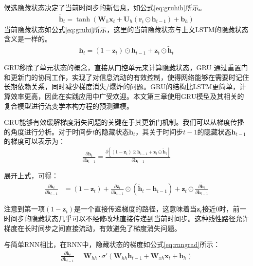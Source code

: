 候选隐藏状态决定了当前时间步的新信息，如公式\eqref{eq:gruhih}所示。
\begin{align}
  \tilde{\mathbf{h}}_t = \tanh(\mathbf{W}_h \mathbf{x}_t + \mathbf{U}_h (\mathbf{r}_t \odot \mathbf{h}_{t-1}) + \mathbf{b}_h) \label{eq:gruhih}
\end{align}
当前隐藏状态如公式\eqref{eq:gruhi}所示，这里的当前隐藏状态与上文LSTM的隐藏状态含义是一样的。
\begin{align}
  \mathbf{h}_t = (1 - \mathbf{z}_t) \odot \mathbf{h}_{t-1} + \mathbf{z}_t \odot \tilde{\mathbf{h}}_t \label{eq:gruhi}
\end{align}

GRU移除了单元状态的概念，直接从门控单元来计算隐藏状态，GRU 通过重置门和更新门的协同工作，实现了对信息流动的有效控制，使得网络能够在需要时记住长期依赖关系，同时减少梯度消失/爆炸的问题。GRU的结构比LSTM更简单，计算效率更高，因此在实践应用中广受欢迎。本文第三章使用GRU模型及其相关的复合模型进行流变学本构方程的预测建模。

GRU能够有效缓解梯度消失问题的关键在于其更新门机制。我们可以从梯度传播的角度进行分析。对于时间步$t$的隐藏状态$\mathbf{h}_t$，其关于时间步$t-1$的隐藏状态$\mathbf{h}_{t-1}$的梯度可以表示为：
\begin{align}
  \frac{\partial \mathbf{h}_t}{\partial \mathbf{h}_{t-1}} = \frac{\partial[(1 - \mathbf{z}_t) \odot \mathbf{h}_{t-1} + \mathbf{z}_t \odot \tilde{\mathbf{h}}_t]}{\partial \mathbf{h}_{t-1}} \label{eq:grugrad1}
\end{align}

展开上式，可得：
\begin{align}
  \frac{\partial \mathbf{h}_t}{\partial \mathbf{h}_{t-1}} & = (1 - \mathbf{z}_t) + \frac{\partial \mathbf{z}_t}{\partial \mathbf{h}_{t-1}} \odot (\tilde{\mathbf{h}}_t - \mathbf{h}_{t-1}) + \mathbf{z}_t \odot \frac{\partial \tilde{\mathbf{h}}_t}{\partial \mathbf{h}_{t-1}} \label{eq:grugrad2}
\end{align}

注意到第一项$(1 - \mathbf{z}_t)$是一个直接传递梯度的路径，这意味着当$\mathbf{z}_t$接近0时，前一时间步的隐藏状态几乎可以不经修改地直接传递到当前时间步。这种线性路径允许梯度在长时间步之间直接流动，有效避免了梯度消失问题。

与简单RNN相比，在RNN中，隐藏状态的梯度如公式\eqref{eq:rnngrad}所示：
\begin{align}
  \frac{\partial \mathbf{h}_t}{\partial \mathbf{h}_{t-1}} = \mathbf{W}_{hh} \cdot \sigma'(\mathbf{W}_{hh} \mathbf{h}_{t-1} + \mathbf{W}_{xh} \mathbf{x}_t + \mathbf{b}_h) \label{eq:rnngrad}
\end{align}

